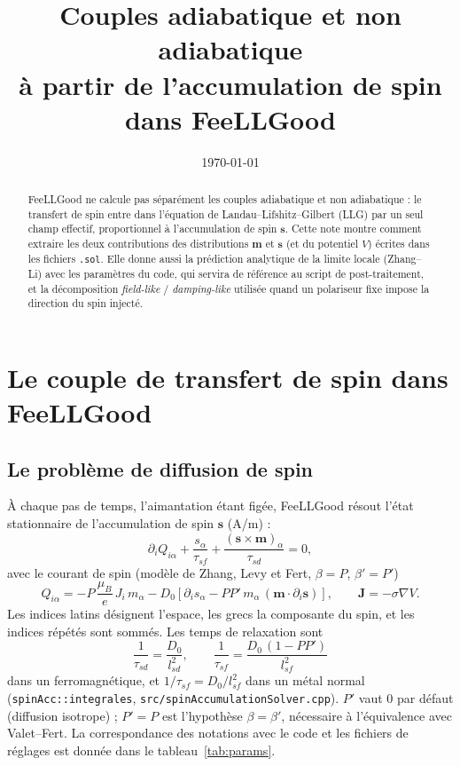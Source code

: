 \documentclass[11pt,a4paper]{article}
\title{Couples adiabatique et non adiabatique\\
à partir de l'accumulation de spin dans FeeLLGood}
\author{}
\date{\today}
\newcommand{\vm}{\bm{m}}
\newcommand{\vs}{\bm{s}}
\newcommand{\vJ}{\bm{J}}
\newcommand{\code}[1]{\texttt{#1}}
\begin{document}
\maketitle

\begin{abstract}
FeeLLGood ne calcule pas séparément les couples adiabatique et non adiabatique : le transfert de
spin entre dans l'équation de Landau--Lifshitz--Gilbert (LLG) par un seul champ effectif,
proportionnel à l'accumulation de spin $\vs$. Cette note montre comment extraire les deux
contributions des distributions $\vm$ et $\vs$ (et du potentiel $V$) écrites dans les fichiers
\code{.sol}. Elle donne aussi la prédiction analytique de la limite locale (Zhang--Li) avec les
paramètres du code, qui servira de référence au script de post-traitement, et la décomposition
\emph{field-like} / \emph{damping-like} utilisée quand un polariseur fixe impose la direction du
spin injecté.
\end{abstract}

\section{Le couple de transfert de spin dans FeeLLGood}

\subsection{Le problème de diffusion de spin}

À chaque pas de temps, l'aimantation étant figée, FeeLLGood résout l'état stationnaire de
l'accumulation de spin $\vs$ (A/m) :
\begin{equation}
  \partial_i Q_{i\alpha} + \frac{s_\alpha}{\tau_{sf}}
  + \frac{(\vs\times\vm)_\alpha}{\tau_{sd}} = 0,
  \label{eq:diffusion}
\end{equation}
avec le courant de spin (modèle de Zhang, Levy et Fert, $\beta=P$, $\beta'=P'$)
\begin{equation}
  Q_{i\alpha} = -P\,\frac{\mu_B}{e}\,J_i\,m_\alpha
  - D_0\left[\partial_i s_\alpha - PP'\,m_\alpha\,(\vm\cdot\partial_i\vs)\right],
  \qquad \vJ = -\sigma\nabla V .
  \label{eq:Q}
\end{equation}
Les indices latins désignent l'espace, les grecs la composante du spin, et les indices répétés
sont sommés. Les temps de relaxation sont
\begin{equation}
  \frac{1}{\tau_{sd}} = \frac{D_0}{l_{sd}^2},\qquad
  \frac{1}{\tau_{sf}} = \frac{D_0\,(1-PP')}{l_{sf}^2}
  \label{eq:taus}
\end{equation}
dans un ferromagnétique, et $1/\tau_{sf} = D_0/l_{sf}^2$ dans un métal normal
(\code{spinAcc::integrales}, \code{src/spinAccumulationSolver.cpp}). $P'$ vaut 0 par défaut
(diffusion isotrope) ; $P'=P$ est l'hypothèse $\beta=\beta'$, nécessaire à l'équivalence avec
Valet--Fert. La correspondance des notations avec le code et les
fichiers de réglages est donnée dans le tableau~\ref{tab:params}.
\end{document}
